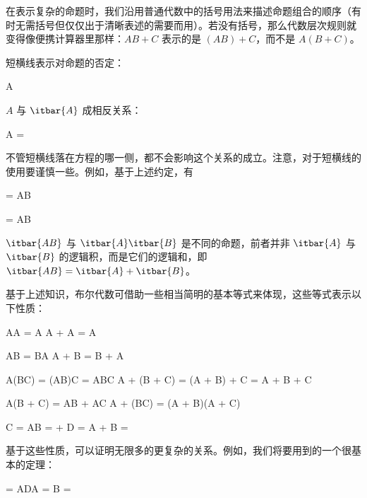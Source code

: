 在表示复杂的命题时，我们沿用普通代数中的括号用法来描述命题组合的顺序（有时无需括号但仅仅出于清晰表述的需要而用）。若没有括号，那么代数层次规则就变得像便携计算器里那样：$AB + C$ 表示的是 $(AB) + C$，而不是 $A(B + C)$。

短横线表示对命题的否定：

\placeformula[1-8]
\startformula
{} \equiv A
\stopformula

$A$ 与 $\itbar{A}$ 成相反关系：

\placeformula
\startformula
A = 
\stopformula

不管短横线落在方程的哪一侧，都不会影响这个关系的成立。注意，对于短横线的使用要谨慎一些。例如，基于上述约定，有

\placeformula
\startformula
{} = AB
\stopformula

\placeformula
\startformula
{} = AB
\stopformula

$\itbar{AB}$ 与 $\itbar{A}\itbar{B}$ 是不同的命题，前者并非 $\itbar{A}$ 与 $\itbar{B}$ 的逻辑积，而是它们的逻辑和，即 $\itbar{AB} = \itbar{A} + \itbar{B}$。

基于上述知识，布尔代数可借助一些相当简明的基本等式来体现，这些等式表示以下性质：

\placeformula[1-12]
\startformula
\startalign[n=2,align={left,left}]
\NC{}
\NC\quad\startmathcases
    \NC AA = A\NR
    \NC A + A = A\NR
\stopmathcases\NR

\NC{}
\NC\quad\startmathcases
    \NC AB = BA\NR
    \NC A + B = B + A\NR
\stopmathcases\NR
				   
\NC{}
\NC\quad\startmathcases
    \NC A(BC) = (AB)C = ABC\NR
    \NC A + (B + C) = (A + B) + C = A + B + C\NR
\stopmathcases\NR

\NC{}
\NC\quad\startmathcases
    \NC A(B + C) = AB + AC\NR
    \NC A + (BC) = (A + B)(A + C)\NR
\stopmathcases\NR

\NC{}
\NC\quad\startmathcases
    \NC{} C = AB  =  + \NR
    \NC {} D = A + B  = \NR
\stopmathcases\NR
\stopalign
\stopformula

基于这些性质，可以证明无限多的更复杂的关系。例如，我们将要用到的一个很基本的定理：

\placeformula[1-13]
\startformula
{} = ADA = B = 
\stopformula

